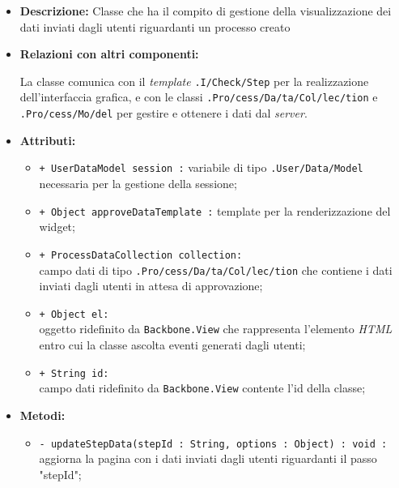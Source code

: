 \begin{flushleft}
\begin{itemize}
\item \textbf{Descrizione:} Classe che ha il compito di gestione della visualizzazione dei dati inviati dagli utenti riguardanti un processo creato
\item \textbf{Relazioni con altri componenti:}
\begin{sloppypar}
La classe comunica con il \textit{template} \texttt{\viewAdmin{}.I\fshyp{}Check\fshyp{}Step} per la realizzazione dell'interfaccia grafica, e con le classi \texttt{\collectionp{}.Pro\fshyp{}cess\fshyp{}Da\fshyp{}ta\fshyp{}Col\fshyp{}lec\fshyp{}tion} e \texttt{\modelAdmin{}.Pro\fshyp{}cess\fshyp{}Mo\fshyp{}del} per gestire e ottenere i dati dal \textit{server}.
\end{sloppypar}
\item \textbf{Attributi:}
\begin{sloppypar}
\begin{itemize}
\item \texttt{+ UserDataModel session :} variabile di tipo \texttt{\model{}.User\fshyp{}Data\fshyp{}Model} necessaria per la gestione della sessione;
\item \texttt{+ Object approveDataTemplate :} template per la renderizzazione del widget;
\item \texttt{+ ProcessDataCollection collection:}\\ campo dati di tipo \texttt{\collectionp{}.Pro\fshyp{}cess\fshyp{}Da\fshyp{}ta\fshyp{}Col\fshyp{}lec\fshyp{}tion} che contiene i dati inviati dagli utenti in attesa di approvazione;
\item \texttt{+ Object el:}\\ oggetto ridefinito da \texttt{Backbone.View} che rappresenta l'elemento \textit{HTML} entro cui la classe ascolta eventi generati dagli utenti;
\item \texttt{+ String id:}\\ campo dati ridefinito da \texttt{Backbone.View} contente l'id della classe;
\end{itemize}
\end{sloppypar}
\item \textbf{Metodi:}
\begin{sloppypar}
\begin{itemize}
\item \texttt{- updateStepData(stepId : String, options : Object) : void :}\\ aggiorna la pagina con i dati inviati dagli utenti riguardanti il passo "stepId";

\end{itemize}
\end{sloppypar}
\end{itemize}
\end{flushleft}
